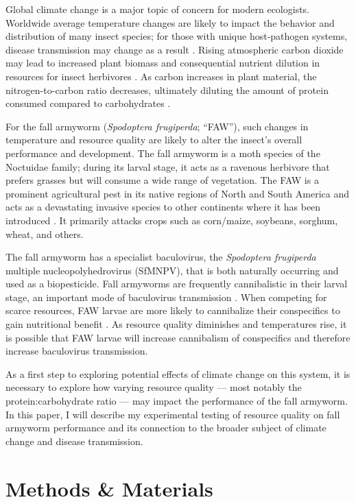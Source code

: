 \documentclass[12pt,]{article}
\begin{document}
Global climate change is a major topic of concern for modern ecologists.
Worldwide average temperature changes are likely to impact the behavior
and distribution of many insect species; for those with unique
host-pathogen systems, disease transmission may change as a result
\autocite{elderd_warmer_2014}. Rising atmospheric carbon dioxide may
lead to increased plant biomass and consequential nutrient dilution in
resources for insect herbivores \autocite{welti_nutrient_2020}. As
carbon increases in plant material, the nitrogen-to-carbon ratio
decreases, ultimately diluting the amount of protein consumed compared
to carbohydrates \autocite{shikano_impact_2015}.

For the fall armyworm (\emph{Spodoptera frugiperda}; ``FAW''), such
changes in temperature and resource quality are likely to alter the
insect's overall performance and development. The fall armyworm is a
moth species of the Noctuidae family; during its larval stage, it acts
as a ravenous herbivore that prefers grasses but will consume a wide
range of vegetation. The FAW is a prominent agricultural pest in its
native regions of North and South America and acts as a devastating
invasive species to other continents where it has been introduced
\autocite{noauthor_spodoptera_nodate}. It primarily attacks crops such
as corn/maize, soybeans, sorghum, wheat, and others.

The fall armyworm has a specialist baculovirus, the \emph{Spodoptera
frugiperda} multiple nucleopolyhedrovirus (SfMNPV), that is both
naturally occurring and used as a biopesticide. Fall armyworms are
frequently cannibalistic in their larval stage, an important mode of
baculovirus transmission \autocite{valicente_cannibalism_2013}. When
competing for scarce resources, FAW larvae are more likely to
cannibalize their conspecifics to gain nutritional benefit
\autocite{ren_functional_2020}. As resource quality diminishes and
temperatures rise, it is possible that FAW larvae will increase
cannibalism of conspecifics and therefore increase baculovirus
transmission.

As a first step to exploring potential effects of climate change on this
system, it is necessary to explore how varying resource quality --- most
notably the protein:carbohydrate ratio --- may impact the performance of
the fall armyworm. In this paper, I will describe my experimental
testing of resource quality on fall armyworm performance and its
connection to the broader subject of climate change and disease
transmission.

\hypertarget{methods-materials}{%
\section{Methods \& Materials}\label{methods-materials}}
\end{document}
